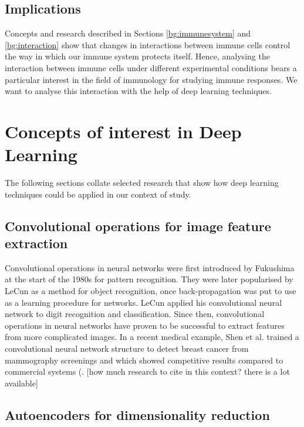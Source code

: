 \subsection{Implications}

Concepts and research described in Sections \ref{bg:immunesystem} and \ref{bg:interaction} show that changes in interactions between immune cells control the way in which our immune system protects itself. Hence, analysing the interaction between immune cells under different experimental conditions bears a particular interest in the field of immunology for studying immune responses. We want to analyse this interaction with the help of deep learning techniques.

\section{Concepts of interest in Deep Learning}

The following sections collate selected research that show how deep learning techniques could be applied in our context of study.

\subsection{Convolutional operations for image feature extraction}

Convolutional operations in neural networks were first introduced by Fukushima at the start of the 1980s for pattern recognition. They were later popularised by LeCun as a method for object recognition, once back-propagation was put to use as a learning procedure for networks. LeCun applied his convolutional neural network to digit recognition and classification. Since then, convolutional operations in neural networks have proven to be successful to extract features from more complicated images. In a recent medical example, Shen et al. trained a convolutional neural network structure to detect breast cancer from mammography screenings and which showed competitive results compared to commercial systems (\cite{https://www.nature.com/articles/s41598-019-48995-4}.
[how much research to cite in this context? there is a lot available]

\subsection{Autoencoders for dimensionality reduction}

